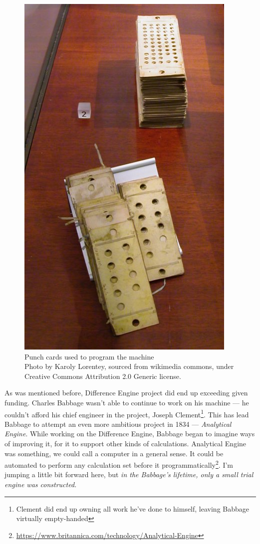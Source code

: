 \documentclass{article}
\begin{document}
            \begin{figure}
                \centering
                \includegraphics[scale=0.8]{images/misc/analytical_engine_punch_cards.jpg}
                \caption{Punch cards used to program the machine\\\tiny{Photo by Karoly Lorentey, sourced from wikimedia commons, under  Creative Commons Attribution 2.0 Generic license.}}
            \end{figure}

            As was mentioned before, Difference Engine project did end up exceeding given funding. Charles Babbage wasn't able to continue to work on his machine --- he couldn't
            afford his chief engineer in the project, Joseph Clement\footnote{Clement did end up owning all work he've done to himself, leaving Babbage virtually empty-handed}.
            This has lead Babbage to attempt an even more ambitious project in 1834 --- \emph{Analytical Engine}. While working on the Difference Engine, Babbage began to imagine
            ways of improving it, for it to support other kinds of calculations. Analytical Engine was something, we could call a computer in a general sense. It could be
            automated to perform any calculation set before it programmatically\footnote{\href{https://www.britannica.com/technology/Analytical-Engine}
            {https://www.britannica.com/technology/Analytical-Engine}}. I'm jumping a little bit forward here, but \emph{in the Babbage's lifetime, only a small trial 
            engine was constructed.}  \par
\end{document}
